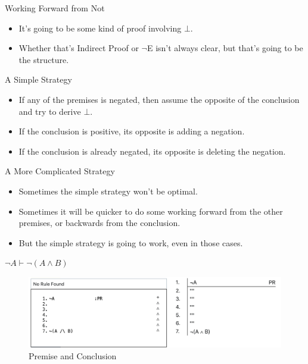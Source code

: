 \documentclass[
  ignorenonframetext,
]{beamer}
\providecommand{\tightlist}{%
  \setlength{\itemsep}{0pt}\setlength{\parskip}{0pt}}
\renewcommand{\,}{\text{, }}
\begin{document}
\begin{frame}{Working Forward from Not}
\protect\hypertarget{working-forward-from-not}{}
\begin{itemize}
\tightlist
\item
  It's going to be some kind of proof involving \(\bot\).
\item
  Whether that's Indirect Proof or \(\neg\)E isn't always clear, but
  that's going to be the structure.
\end{itemize}
\end{frame}

\begin{frame}{A Simple Strategy}
\protect\hypertarget{a-simple-strategy}{}
\begin{itemize}
\tightlist
\item
  If any of the premises is negated, then assume the opposite of the
  conclusion and try to derive \(\bot\).
\item
  If the conclusion is positive, its opposite is adding a negation.
\item
  If the conclusion is already negated, its opposite is deleting the
  negation.
\end{itemize}
\end{frame}

\begin{frame}{A More Complicated Strategy}
\protect\hypertarget{a-more-complicated-strategy}{}
\begin{itemize}
\tightlist
\item
  Sometimes the simple strategy won't be optimal.
\item
  Sometimes it will be quicker to do some working forward from the other
  premises, or backwards from the conclusion.
\item
  But the simple strategy is going to work, even in those cases.
\end{itemize}
\end{frame}

\begin{frame}{\(\neg A \vdash \neg (A \wedge B)\)}
\protect\hypertarget{neg-a-vdash-neg-a-wedge-b}{}
\begin{figure}
\centering
\includegraphics[width=\textwidth,height=0.75\textheight]{5_5f.png}
\caption{Premise and Conclusion}
\end{figure}
\end{frame}
\end{document}

